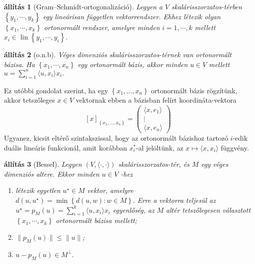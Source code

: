 \documentclass[9pt, a4paper, showtrims]{memoir}
\theoremstyle{plain}
\newtheorem{proposition}{állítás}[chapter]
\theoremstyle{remark}
\theoremstyle{definition}
\DeclareMathOperator{\lin}{lin}
\newcommand{\ip}[2]{\langle#1,#2\rangle}
\begin{document}
\begin{proposition}[Gram--Schmidt-ortogonalizáció]
    Legyen a $V$ skalárisszorzatos-térben $\left\{ y_1,\cdots,y_k \right\}$ egy lineárisan független
    vektorrendszer. 
    Ehhez létezik olyan $\left\{ x_1,\cdots,x_k \right\}$ ortonormált rendszer, 
    amelyre minden $i=1,\cdots,k$ mellett $x_i\in\lin\left\{ y_1,\cdots,y_i \right\}$.
\end{proposition}

\begin{proposition}[o.n.b]
    Véges dimenziós skalárisszorzatos-térnek van ortonormált bázisa.
    Ha $\left\{ x_1,\cdots,x_n \right\}$ egy ortonormált bázis, akkor minden $u\in V$ mellett
    \(
        u=
        \sum_{i=1}^n\ip{u}{x_i}x_i.
    \)
\end{proposition}
Ez utóbbi gondolat szerint,
ha egy $\left\{ x_1,\dots,x_n \right\}$ ortonormált bázis rögzítünk,
akkor tetszőleges $x\in V$ vektornak ebben a bázisban felírt koordináta-vektora
\[
    [x]_{\left\{x_1,\dots,x_n\right\}}
    =
    \begin{pmatrix}
        \ip{x}{e_1}\\ \vdots \\\ip{x}{e_n}
    \end{pmatrix}
\]
Ugyanez, kicsit eltérő szintakszissal, hogy az ortonormált bázishoz tartozó
$i$-edik duális lineáris funkcionál, amit korábban $x_i^\ast$-al jelöltünk, az $x\mapsto\ip{x}{x_i}$
függvény.
\begin{proposition}[Bessel]
    Legyen $\left( V,\ip{\cdot}{\cdot} \right)$ skalárisszorzatos-tér, és $M$ egy 
    véges dimenziós altere.
    Ekkor minden $u\in V$ -hez
    \begin{enumerate}
        \item létezik egyetlen $u^\star\in M$ vektor, amelyre
        \(
        d\left( u,u^\star\right)
        =
        \min\left\{ d\left( u,w \right):w\in M \right\}.
        \)
        Erre a vektorra teljesül az $u^\star=p_M\left( u \right)=\sum_{i=1}^k\ip{u}{x_i}x_i$ egyenlőség, 
        az $M$ altér tetszőlegesen választott  $\left\{ x_1,\cdots,x_k \right\}$ ortonormált bázisa mellett;
        \item
            $\|p_M\left( u \right)\|\leq\|u\|$;
        \item
            \(
            u-p_M(u)\in M^\perp.
            \) 
            \qedhere
    \end{enumerate}
\end{proposition}
\end{document}
